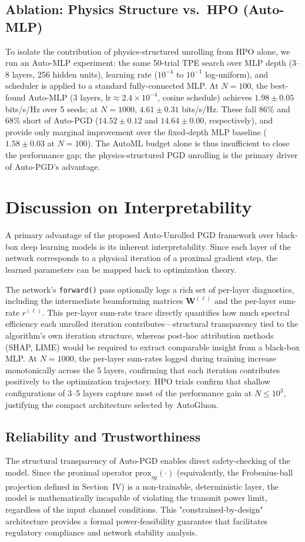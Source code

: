 \documentclass[conference,11pt]{IEEEtran}
\begin{document}
\subsection{Ablation: Physics Structure vs.\ HPO (Auto-MLP)}
To isolate the contribution of physics-structured unrolling from HPO alone, we run an Auto-MLP experiment: the same 50-trial TPE search over MLP depth (3--8 layers, 256 hidden units), learning rate ($10^{-4}$ to $10^{-1}$ log-uniform), and scheduler is applied to a standard fully-connected MLP. At $N{=}100$, the best-found Auto-MLP (3 layers, lr$\approx 2.4{\times}10^{-4}$, cosine schedule) achieves $1.98{\pm}0.05$ bits/s/Hz over 5 seeds; at $N{=}1000$, $4.61{\pm}0.31$ bits/s/Hz. These fall $86\%$ and $68\%$ short of Auto-PGD ($14.52{\pm}0.12$ and $14.64{\pm}0.00$, respectively), and provide only marginal improvement over the fixed-depth MLP baseline ($1.58{\pm}0.03$ at $N{=}100$). The AutoML budget alone is thus insufficient to close the performance gap; the physics-structured PGD unrolling is the primary driver of Auto-PGD's advantage.

\section{Discussion on Interpretability}
A primary advantage of the proposed Auto-Unrolled PGD framework over black-box deep learning models is its inherent interpretability. Since each layer of the network corresponds to a physical iteration of a proximal gradient step, the learned parameters can be mapped back to optimization theory.

The network's \texttt{forward()} pass optionally logs a rich set of per-layer diagnostics, including the intermediate beamforming matrices $\mathbf{W}^{(\ell)}$ and the per-layer sum-rate $r^{(\ell)}$. This per-layer sum-rate trace directly quantifies how much spectral efficiency each unrolled iteration contributes—structural transparency tied to the algorithm's own iteration structure, whereas post-hoc attribution methods (SHAP, LIME) would be required to extract comparable insight from a black-box MLP. At $N{=}1000$, the per-layer sum-rates logged during training increase monotonically across the 5 layers, confirming that each iteration contributes positively to the optimization trajectory. HPO trials confirm that shallow configurations of 3--5 layers capture most of the performance gain at $N \leq 10^3$, justifying the compact architecture selected by AutoGluon.
\subsection{Reliability and Trustworthiness}
The structural transparency of Auto-PGD enables direct safety-checking of the model. Since the proximal operator $\text{prox}_{\eta g}(\cdot)$ (equivalently, the Frobenius-ball projection defined in Section~IV) is a non-trainable, deterministic layer, the model is mathematically incapable of violating the transmit power limit, regardless of the input channel conditions. This "constrained-by-design" architecture provides a formal power-feasibility guarantee that facilitates regulatory compliance and network stability analysis.
\end{document}

